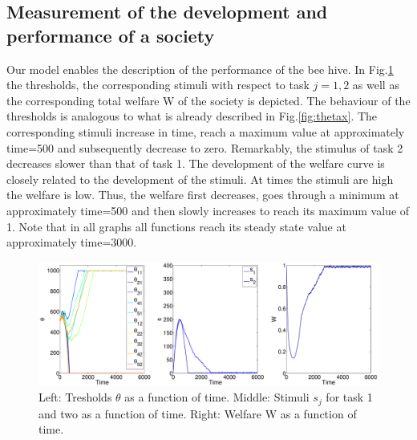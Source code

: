 \subsection{Measurement of the development and performance of a society}
Our model enables the description of the performance of the bee hive. In Fig.\ref{fig:welstim} the thresholds, the corresponding stimuli with respect to task $j=1, 2$ as well as the corresponding total welfare W of the society is depicted. The behaviour of the thresholds is analogous to what is already described in Fig.\ref{fig:thetax}. The corresponding stimuli increase in time, reach a maximum value at approximately time=500 and subsequently decrease to zero. Remarkably, the stimulus of task 2 decreases slower than that of task 1. The development of the welfare curve is closely related to the development of the stimuli. At times the stimuli are high the welfare is low. Thus, the welfare first decreases, goes through a minimum at approximately time=500 and then slowly increases to reach its maximum value of 1. Note that in all graphs all functions reach its steady state value at approximately time=3000.

\begin{figure}[ht!]
	\centerline{\includegraphics[width=1.25\textwidth]{figures/welstim.eps}}
	
	\caption{Left: Tresholds $\theta$ as a function of time. Middle: Stimuli $s_{j}$ for task 1 and two as a function of time. Right: Welfare W as a function of time.}
	\label{fig:welstim}
\end{figure}

